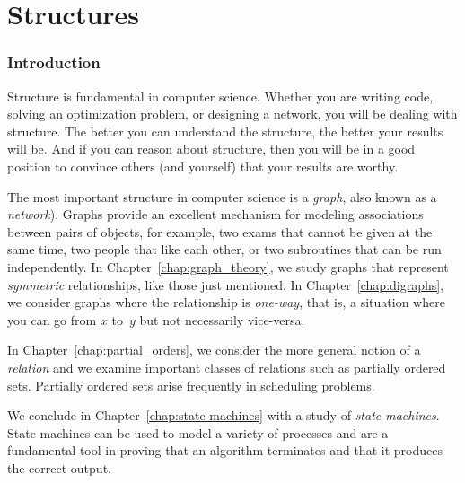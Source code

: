 \part{Structures}
\label{part:structures}

\clearpage

\section*{Introduction}

Structure is fundamental in computer science.  Whether you are writing
code, solving an optimization problem, or designing a network, you
will be dealing with structure.  The better you can understand the
structure, the better your results will be.  And if you can reason
about structure, then you will be in a good position to convince
others (and yourself) that your results are worthy.

The most important structure in computer science is a \emph{graph},
also known as a \emph{network}).  Graphs provide an excellent
mechanism for modeling associations between pairs of objects, for
example, two exams that cannot be given at the same time, two people
that like each other, or two subroutines that can be run
independently.  In Chapter~\ref{chap:graph_theory}, we study graphs
that represent \emph{symmetric} relationships, like those just
mentioned.  In Chapter~\ref{chap:digraphs}, we consider graphs where
the relationship is \emph{one-way}, that is, a situation where you can
go from $x$ to~$y$ but not necessarily vice-versa.

In Chapter~\ref{chap:partial_orders}, we consider the more general
notion of a \emph{relation} and we examine important classes of
relations such as partially ordered sets.  Partially ordered sets
arise frequently in scheduling problems.

We conclude in Chapter~\ref{chap:state-machines} with a study of
\emph{state machines}.  State machines can be used to model a variety
of processes and are a fundamental tool in proving that an algorithm
terminates and that it produces the correct output.

\endinput
